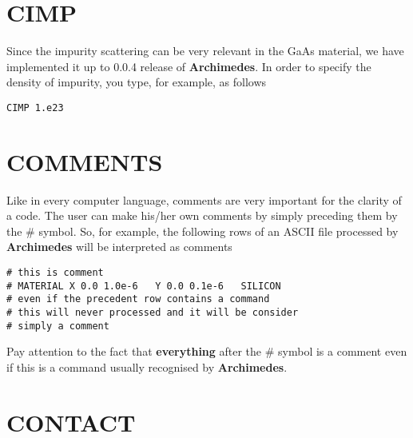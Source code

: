 \documentclass[12pt]{book}
\begin{document}
\section{CIMP}
Since the impurity scattering can be very relevant in the GaAs material, we have implemented it up to 0.0.4 release of \textbf{Archimedes}. In order to specify the density of impurity, you type, for example, as follows
\begin{verbatim}
CIMP 1.e23
\end{verbatim}

\section{COMMENTS}

Like in every computer language, comments are very important for the clarity of a code. The user can make his/her own comments by simply preceding them by the \# symbol. So, for example, the following rows of an ASCII file processed by \textbf{Archimedes} will be interpreted as comments

\begin{verbatim}
# this is comment
# MATERIAL X 0.0 1.0e-6   Y 0.0 0.1e-6   SILICON
# even if the precedent row contains a command
# this will never processed and it will be consider
# simply a comment
\end{verbatim}

Pay attention to the fact that \textbf{everything} after the \# symbol is a comment even if this is a command usually recognised by \textbf{Archimedes}.

\section{CONTACT}
\end{document}
